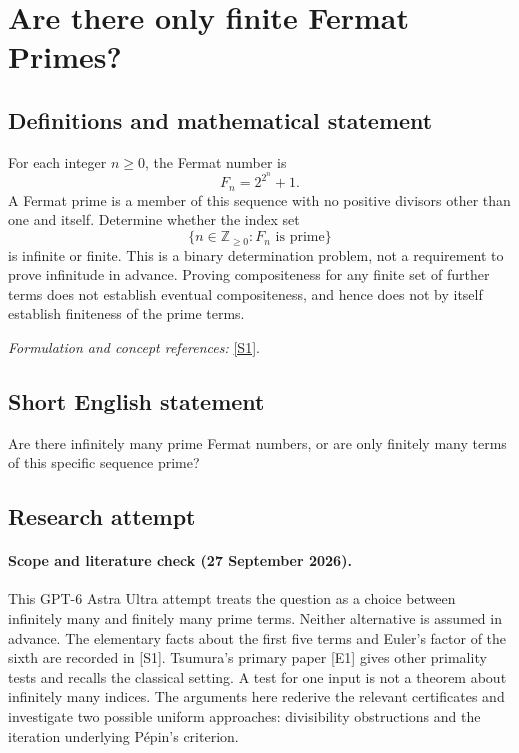 \documentclass[11pt]{article}
\begin{document}
\section*{\texorpdfstring{Are there only finite Fermat Primes?}{Are there only finite Fermat Primes?}}\label{statement}
\subsection{Definitions and mathematical statement}
For each integer $n\ge0$, the Fermat number is
\[
 F_n=2^{2^n}+1.
\]
A Fermat prime is a member of this sequence with no positive divisors other than one and itself. Determine whether the index set
\[
 \{n\in{\mathbb{Z}}_{\ge0}:F_n\text{ is prime}\}
\]
is infinite or finite. This is a binary determination problem, not a requirement to prove infinitude in advance. Proving compositeness for any finite set of further terms does not establish eventual compositeness, and hence does not by itself establish finiteness of the prime terms.
\par\smallskip\textit{Formulation and concept references:} \href{https://webusers.imj-prg.fr/~michel.waldschmidt/articles/pdf/NTchallengesVI.pdf}{[S1]}.

\subsection{Short English statement}
Are there infinitely many prime Fermat numbers, or are only finitely many terms of this specific sequence prime?
\subsection{Research attempt}
\paragraph{Scope and literature check (27 September 2026).}
This GPT-6 Astra Ultra attempt treats the question as a choice between
infinitely many and finitely many prime terms. Neither alternative is
assumed in advance. The elementary facts about the first five terms and
Euler's factor of the sixth are recorded in [S1]. Tsumura's primary
paper [E1] gives other primality tests and recalls the classical setting.
A test for one input is not a theorem about infinitely many indices.
The arguments here rederive the relevant certificates and investigate
two possible uniform approaches: divisibility obstructions and the
iteration underlying P\'epin's criterion.
\end{document}

